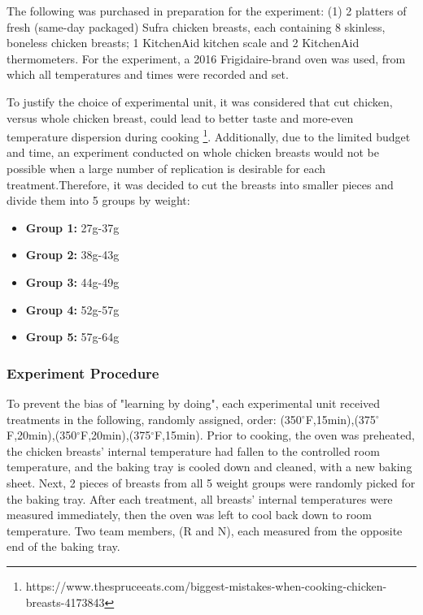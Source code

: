 \documentclass[a4paper]{article}
\begin{document}
The following was purchased in preparation for the experiment: (1) 2 platters of fresh (same-day packaged) Sufra chicken breasts, each containing 8 skinless, boneless chicken breasts; 1 KitchenAid kitchen scale and 2 KitchenAid thermometers. For the experiment, a 2016 Frigidaire-brand oven was used, from which all temperatures and times were recorded and set. 

To justify the choice of experimental unit, it was considered that cut chicken, versus whole chicken breast, could lead to better taste and more-even temperature dispersion during cooking \footnote{https://www.thespruceeats.com/biggest-mistakes-when-cooking-chicken-breasts-4173843}. Additionally, due to the limited budget and time, an experiment conducted on whole chicken breasts would not be possible when a large number of replication is desirable for each treatment.Therefore, it was decided to cut the breasts into smaller pieces and divide them into 5 groups by weight: 
\begin{itemize}
    \item{\textbf{Group 1: }27g-37g}
    \item{\textbf{Group 2: }38g-43g}
    \item{\textbf{Group 3: }44g-49g}
    \item{\textbf{Group 4: }52g-57g}
    \item{\textbf{Group 5: }57g-64g}
\end{itemize}

\subsubsection{Experiment Procedure}\label{Experiment Procedure}
\vspace{-0.25cm}
\par\hspace{0.5cm}To prevent the bias of "learning by doing", each experimental unit received treatments in the following, randomly assigned, order: (350$^{\circ}$F,15min),(375$^{\circ}$F,20min),(350$^{\circ}$F,20min),(375$^{\circ}$F,15min). Prior to cooking, the oven was preheated, the chicken breasts' internal temperature had fallen to the controlled room temperature, and the baking tray is cooled down and cleaned, with a new baking sheet. Next, 2 pieces of breasts from all 5 weight groups were randomly picked for the baking tray. After each treatment, all breasts' internal temperatures were measured immediately, then the oven was left to cool back down to room temperature. Two team members, (R and N), each measured from the opposite end of the baking tray. \\
\end{document}
